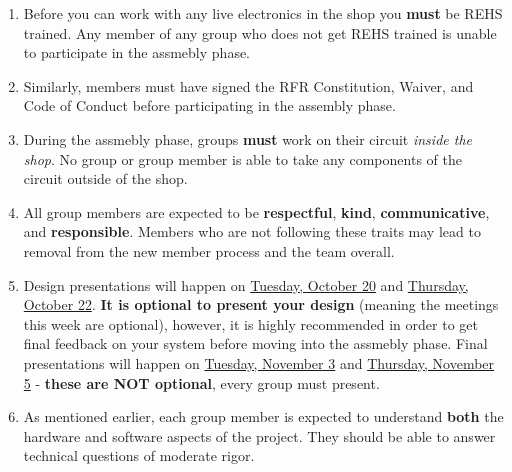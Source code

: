 \documentclass{article}
\begin{document}
\begin{enumerate}
        \item Before you can work with any live electronics in the shop you \textbf{must} be REHS trained. Any member of any group who does not get REHS trained is unable to participate in the assmebly phase.

        \item Similarly, members must have signed the RFR Constitution, Waiver, and Code of Conduct before participating in the assembly phase.

        \item During the assmebly phase, groups \textbf{must} work on their circuit \textit{inside the shop}. No group or group member is able to take any components of the circuit outside of the shop.

        \item All group members are expected to be \textbf{respectful}, \textbf{kind}, \textbf{communicative}, and \textbf{responsible}. Members who are not following these traits may lead to removal from the new member process and the team overall.

        \item Design presentations will happen on \underline{Tuesday, October 20} and \underline{Thursday, October 22}. \textbf{It is optional to present your design} (meaning the meetings this week are optional), however, it is highly recommended in order to get final feedback on your system before moving into the assmebly phase. Final presentations will happen on \underline{Tuesday, November 3} and \underline{Thursday, November 5} - \textbf{these are NOT optional}, every group must present.
        \item As mentioned earlier, each group member is expected to understand \textbf{both} the hardware and software aspects of the project. They should be able to answer technical questions of moderate rigor.
    \end{enumerate}

\end{document}
